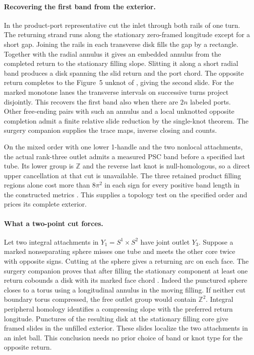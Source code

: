 \documentclass[11pt,letterpaper]{article}
\numberwithin{equation}{section}
\begin{document}
\paragraph{Recovering the first band from the exterior.}
In the product-port representative cut the inlet through both rails
of one turn. The returning strand runs along the stationary
zero-framed longitude except for a short gap. Joining the rails in
each transverse disk fills the gap by a rectangle. Together with
the radial annulus it gives an embedded annulus from the completed
return to the stationary filling slope. Slitting it along a short
radial band produces a disk spanning the slid return and the port
chord. The opposite return completes to the Figure~5 unknot of
\cite{GompfScharlemannThompson2010}, giving the second slide.
For the marked monotone lanes the transverse intervals on successive
turns project disjointly. This recovers the first band also when
there are \(2n\) labeled ports. Other free-ending pairs with such
an annulus and a local unknotted opposite completion admit a finite
relative slide reduction by the single-knot theorem. The surgery
companion supplies the trace maps, inverse closing and counts.

On the mixed order with one lower 1-handle and the two nonlocal
attachments, the actual rank-three outlet admits a measured PSC
band before a specified last tube. Its lower group is \(\mathbb Z\)
and the reverse last knot is null-homologous, so a direct upper
cancellation at that cut is unavailable. The three retained product
filling regions alone cost more than \(8\pi^2\) in each sign for
every positive band length in the constructed metrics
\cite{Baker2026HandleCuts}. This supplies a topology test on the
specified order and prices its complete exterior.

\paragraph{What a two-point cut forces.}
Let two integral attachments in \(Y_1=S^1\times S^2\) have joint
outlet \(Y_3\). Suppose a marked nonseparating sphere misses one
tube and meets the other core twice with opposite signs. Cutting
at the sphere gives a returning arc on each face. The surgery
companion proves that after filling the stationary component at
least one return cobounds a disk with its marked face chord
\cite{Baker2026HandleCuts}. Indeed the punctured sphere closes to
a torus using a longitudinal annulus in the moving filling. If
neither cut boundary torus compressed, the free outlet group would
contain \(\mathbb Z^2\). Integral peripheral homology identifies a
compressing slope with the preferred return longitude. Punctures
of the resulting disk at the stationary filling core give framed
slides in the unfilled exterior. These slides localize the two
attachments in an inlet ball. This conclusion needs no prior choice
of band or knot type for the opposite return.
\end{document}
